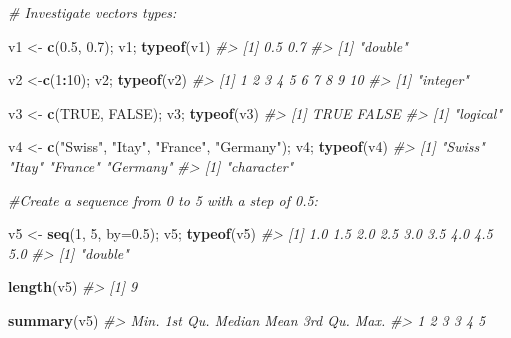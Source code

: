 \documentclass[
]{book}
\newenvironment{Shaded}{\begin{snugshade}}{\end{snugshade}}
\newcommand{\AttributeTok}[1]{\textcolor[rgb]{0.13,0.29,0.53}{#1}}
\newcommand{\CommentTok}[1]{\textcolor[rgb]{0.56,0.35,0.01}{\textit{#1}}}
\newcommand{\ConstantTok}[1]{\textcolor[rgb]{0.56,0.35,0.01}{#1}}
\newcommand{\DecValTok}[1]{\textcolor[rgb]{0.00,0.00,0.81}{#1}}
\newcommand{\FloatTok}[1]{\textcolor[rgb]{0.00,0.00,0.81}{#1}}
\newcommand{\FunctionTok}[1]{\textcolor[rgb]{0.13,0.29,0.53}{\textbf{#1}}}
\newcommand{\NormalTok}[1]{#1}
\newcommand{\OtherTok}[1]{\textcolor[rgb]{0.56,0.35,0.01}{#1}}
\newcommand{\SpecialCharTok}[1]{\textcolor[rgb]{0.81,0.36,0.00}{\textbf{#1}}}
\newcommand{\StringTok}[1]{\textcolor[rgb]{0.31,0.60,0.02}{#1}}
\theoremstyle{definition}
\theoremstyle{definition}
\theoremstyle{definition}
\theoremstyle{definition}
\theoremstyle{remark}
\begin{document}
\begin{Shaded}
\begin{Highlighting}[]
\CommentTok{\# Investigate vector\textquotesingle{}s types:}

\NormalTok{v1 }\OtherTok{\textless{}{-}} \FunctionTok{c}\NormalTok{(}\FloatTok{0.5}\NormalTok{, }\FloatTok{0.7}\NormalTok{); v1; }\FunctionTok{typeof}\NormalTok{(v1)}
\CommentTok{\#\textgreater{} [1] 0.5 0.7}
\CommentTok{\#\textgreater{} [1] "double"}

\NormalTok{v2 }\OtherTok{\textless{}{-}}\FunctionTok{c}\NormalTok{(}\DecValTok{1}\SpecialCharTok{:}\DecValTok{10}\NormalTok{); v2; }\FunctionTok{typeof}\NormalTok{(v2)}
\CommentTok{\#\textgreater{}  [1]  1  2  3  4  5  6  7  8  9 10}
\CommentTok{\#\textgreater{} [1] "integer"}

\NormalTok{v3 }\OtherTok{\textless{}{-}} \FunctionTok{c}\NormalTok{(}\ConstantTok{TRUE}\NormalTok{, }\ConstantTok{FALSE}\NormalTok{); v3; }\FunctionTok{typeof}\NormalTok{(v3)}
\CommentTok{\#\textgreater{} [1]  TRUE FALSE}
\CommentTok{\#\textgreater{} [1] "logical"}

\NormalTok{v4 }\OtherTok{\textless{}{-}} \FunctionTok{c}\NormalTok{(}\StringTok{"Swiss"}\NormalTok{, }\StringTok{"Itay"}\NormalTok{, }\StringTok{"France"}\NormalTok{, }\StringTok{"Germany"}\NormalTok{); v4; }\FunctionTok{typeof}\NormalTok{(v4)}
\CommentTok{\#\textgreater{} [1] "Swiss"   "Itay"    "France"  "Germany"}
\CommentTok{\#\textgreater{} [1] "character"}
\end{Highlighting}
\end{Shaded}

\begin{Shaded}
\begin{Highlighting}[]
\CommentTok{\#Create a sequence from 0 to 5 with a step of 0.5:}

\NormalTok{v5 }\OtherTok{\textless{}{-}} \FunctionTok{seq}\NormalTok{(}\DecValTok{1}\NormalTok{, }\DecValTok{5}\NormalTok{, }\AttributeTok{by=}\FloatTok{0.5}\NormalTok{); v5; }\FunctionTok{typeof}\NormalTok{(v5)}
\CommentTok{\#\textgreater{} [1] 1.0 1.5 2.0 2.5 3.0 3.5 4.0 4.5 5.0}
\CommentTok{\#\textgreater{} [1] "double"}

\FunctionTok{length}\NormalTok{(v5)}
\CommentTok{\#\textgreater{} [1] 9}

\FunctionTok{summary}\NormalTok{(v5)}
\CommentTok{\#\textgreater{}    Min. 1st Qu.  Median    Mean 3rd Qu.    Max. }
\CommentTok{\#\textgreater{}       1       2       3       3       4       5}
\end{Highlighting}
\end{Shaded}
\end{document}
